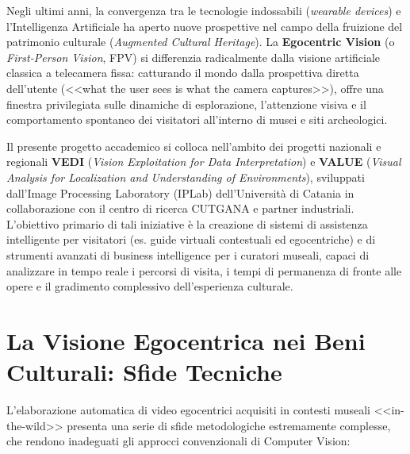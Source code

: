 \documentclass[a4paper,12pt]{report}
\begin{document}
Negli ultimi anni, la convergenza tra le tecnologie indossabili (\emph{wearable devices}) e l'Intelligenza Artificiale ha aperto nuove prospettive nel campo della fruizione del patrimonio culturale (\emph{Augmented Cultural Heritage}). La \textbf{Egocentric Vision} (o \emph{First-Person Vision}, FPV) si differenzia radicalmente dalla visione artificiale classica a telecamera fissa: catturando il mondo dalla prospettiva diretta dell'utente (<<what the user sees is what the camera captures>>), offre una finestra privilegiata sulle dinamiche di esplorazione, l'attenzione visiva e il comportamento spontaneo dei visitatori all'interno di musei e siti archeologici.

Il presente progetto accademico si colloca nell'ambito dei progetti nazionali e regionali \textbf{VEDI} (\emph{Vision Exploitation for Data Interpretation}) e \textbf{VALUE} (\emph{Visual Analysis for Localization and Understanding of Environments}), sviluppati dall'Image Processing Laboratory (IPLab) dell'Università di Catania in collaborazione con il centro di ricerca CUTGANA e partner industriali. L'obiettivo primario di tali iniziative è la creazione di sistemi di assistenza intelligente per visitatori (es. guide virtuali contestuali ed egocentriche) e di strumenti avanzati di business intelligence per i curatori museali, capaci di analizzare in tempo reale i percorsi di visita, i tempi di permanenza di fronte alle opere e il gradimento complessivo dell'esperienza culturale.

\section{La Visione Egocentrica nei Beni Culturali: Sfide Tecniche}

L'elaborazione automatica di video egocentrici acquisiti in contesti museali <<in-the-wild>> presenta una serie di sfide metodologiche estremamente complesse, che rendono inadeguati gli approcci convenzionali di Computer Vision:
\end{document}
